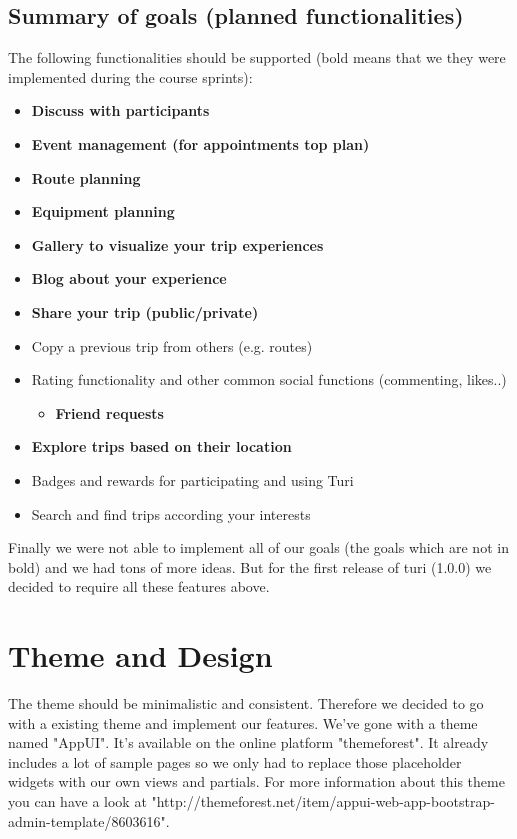 \documentclass[a4paper]{article}
\begin{document}
\subsection{Summary of goals (planned functionalities)}
The following functionalities should be supported (bold means that we they were implemented during the course sprints):
\begin{itemize}
  \item {\textbf{Discuss with participants}}
  \item {\textbf{Event management (for appointments top plan)}}
  \item {\textbf{Route planning}}
  \item {\textbf{Equipment planning}}
  \item {\textbf{Gallery to visualize your trip experiences}}
  \item {\textbf{Blog about your experience}}
  \item {\textbf{Share your trip (public/private)}}
  \item {Copy a previous trip from others (e.g. routes)}
  \item {Rating functionality and other common social functions (commenting, likes..)
  \begin{itemize}
    \item {\textbf{Friend requests}}
  \end{itemize}}
  \item {\textbf{Explore trips based on their location}}
  \item {Badges and rewards for participating and using Turi}
  \item {Search and find trips according your interests}
\end{itemize}

\noindent
Finally we were not able to implement all of our goals (the goals which are not in bold) and we had tons of more ideas. But for the first release of turi (1.0.0) we decided to require all these features above.\\

\section{Theme and Design}
The theme should be minimalistic and consistent. Therefore we decided to go with a existing theme and implement our features. We've gone with a theme named "AppUI". It's available on the online platform "themeforest". It already includes a lot of sample pages so we only had to replace those placeholder widgets with our own views and partials. For more information about this theme you can have a look at "http://themeforest.net/item/appui-web-app-bootstrap-admin-template/8603616".
\end{document}
